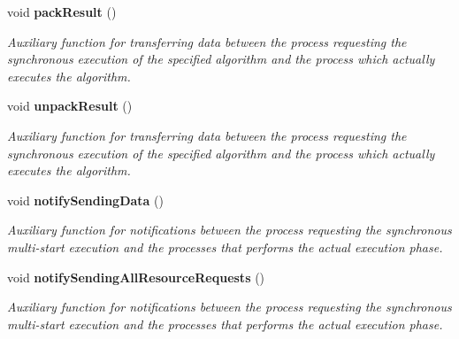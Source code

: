 \begin{CompactItemize}
void {\bf pack\-Result} ()
\begin{CompactList}\small\item\em Auxiliary function for transferring data between the process requesting the synchronous execution of the specified algorithm and the process which actually executes the algorithm. \item\end{CompactList}\item 
void {\bf unpack\-Result} ()
\begin{CompactList}\small\item\em Auxiliary function for transferring data between the process requesting the synchronous execution of the specified algorithm and the process which actually executes the algorithm. \item\end{CompactList}\item 
void {\bf notify\-Sending\-Data} ()
\begin{CompactList}\small\item\em Auxiliary function for notifications between the process requesting the synchronous multi-start execution and the processes that performs the actual execution phase. \item\end{CompactList}\item 
void {\bf notify\-Sending\-All\-Resource\-Requests} ()
\begin{CompactList}\small\item\em Auxiliary function for notifications between the process requesting the synchronous multi-start execution and the processes that performs the actual execution phase. \item\end{CompactList}\end{CompactItemize}
